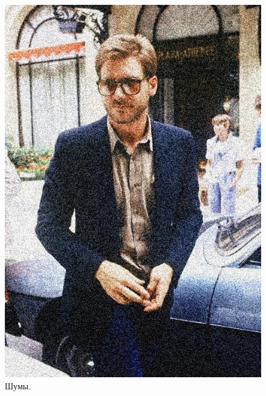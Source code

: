 \documentclass[a4paper,12pt]{article}
\begin{document}
\begin{figure}[h]
\begin{minipage}[h]{0.2\linewidth}
\includegraphics[width=1\linewidth]{Pic_Noises}
Шумы.
\end{minipage}
$\mspace{30mu}$
\begin{minipage}[h]{0.2\linewidth}

\end{minipage}
\end{figure}
\end{document}
